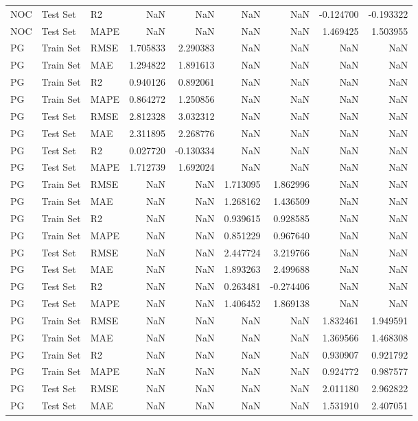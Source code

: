 \begin{tabular}{lllrrrrrr}
NOC & Test Set & R2 & NaN & NaN & NaN & NaN & -0.124700 & -0.193322 \\
NOC & Test Set & MAPE & NaN & NaN & NaN & NaN & 1.469425 & 1.503955 \\
PG & Train Set & RMSE & 1.705833 & 2.290383 & NaN & NaN & NaN & NaN \\
PG & Train Set & MAE & 1.294822 & 1.891613 & NaN & NaN & NaN & NaN \\
PG & Train Set & R2 & 0.940126 & 0.892061 & NaN & NaN & NaN & NaN \\
PG & Train Set & MAPE & 0.864272 & 1.250856 & NaN & NaN & NaN & NaN \\
PG & Test Set & RMSE & 2.812328 & 3.032312 & NaN & NaN & NaN & NaN \\
PG & Test Set & MAE & 2.311895 & 2.268776 & NaN & NaN & NaN & NaN \\
PG & Test Set & R2 & 0.027720 & -0.130334 & NaN & NaN & NaN & NaN \\
PG & Test Set & MAPE & 1.712739 & 1.692024 & NaN & NaN & NaN & NaN \\
PG & Train Set & RMSE & NaN & NaN & 1.713095 & 1.862996 & NaN & NaN \\
PG & Train Set & MAE & NaN & NaN & 1.268162 & 1.436509 & NaN & NaN \\
PG & Train Set & R2 & NaN & NaN & 0.939615 & 0.928585 & NaN & NaN \\
PG & Train Set & MAPE & NaN & NaN & 0.851229 & 0.967640 & NaN & NaN \\
PG & Test Set & RMSE & NaN & NaN & 2.447724 & 3.219766 & NaN & NaN \\
PG & Test Set & MAE & NaN & NaN & 1.893263 & 2.499688 & NaN & NaN \\
PG & Test Set & R2 & NaN & NaN & 0.263481 & -0.274406 & NaN & NaN \\
PG & Test Set & MAPE & NaN & NaN & 1.406452 & 1.869138 & NaN & NaN \\
PG & Train Set & RMSE & NaN & NaN & NaN & NaN & 1.832461 & 1.949591 \\
PG & Train Set & MAE & NaN & NaN & NaN & NaN & 1.369566 & 1.468308 \\
PG & Train Set & R2 & NaN & NaN & NaN & NaN & 0.930907 & 0.921792 \\
PG & Train Set & MAPE & NaN & NaN & NaN & NaN & 0.924772 & 0.987577 \\
PG & Test Set & RMSE & NaN & NaN & NaN & NaN & 2.011180 & 2.962822 \\
PG & Test Set & MAE & NaN & NaN & NaN & NaN & 1.531910 & 2.407051 \\

\end{tabular}
